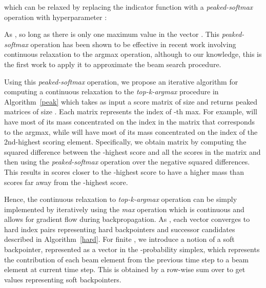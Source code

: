 \documentclass[letterpaper]{article} \usepackage{aaai18}  \usepackage{times}  \usepackage{helvet}  \usepackage{courier}  \usepackage{url}  \usepackage{graphicx}  \frenchspacing
\begin{document}
which can be relaxed by replacing the indicator function with a \emph{peaked-softmax} operation with hyperparameter :

As ,  so long as there is only one maximum value in the vector . This \emph{peaked-softmax} operation has been shown to be effective in recent work \cite{maddison2016concrete,jang2016categorical,softgreedy} involving continuous relaxation to the argmax operation, although to our knowledge, this is the first work to apply it to approximate the beam search procedure. 

Using this \emph{peaked-softmax} operation, we propose an iterative algorithm for computing a continuous relaxation to the \textit{top-k-argmax} procedure in Algorithm~\ref{peak} which takes as input a score matrix of size  and returns  peaked matrices  of size . Each matrix  represents the index of -th max. For example,  will have most of its mass concentrated on the index in the matrix that corresponds to the argmax, while  will have most of its mass concentrated on the index of the 2nd-highest scoring element. Specifically, we obtain matrix  by computing the squared difference between the -highest score and all the scores in the matrix and then using the \emph{peaked-softmax} operation over the negative squared differences. This results in scores closer to the -highest score to have a higher mass than scores far away from the -highest score.

Hence, the continuous relaxation to \textit{top-k-argmax} operation can be simply implemented by iteratively using the \textit{max} operation which is continuous and allows for gradient flow during backpropagation. As , each  vector converges to hard index pairs representing hard backpointers and successor candidates described in Algorithm~\ref{hard}. For finite , we introduce a notion of a soft backpointer, represented as a vector  in the -probability simplex, which represents the contribution of each beam element from the previous time step to a beam element at current time step. This is obtained by a row-wise sum over  to get  values representing soft backpointers. 
\end{document}
